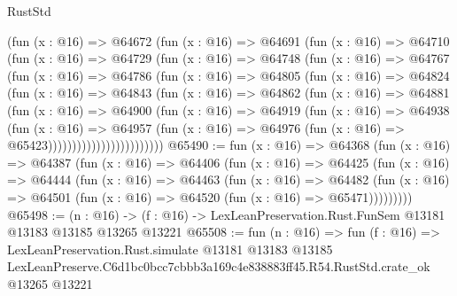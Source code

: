\begin{lexlean}{RustStd}
\begin{coremodule}
                (fun (x : @16) =>
                @64672
                  (fun (x : @16) =>
                  @64691
                    (fun (x : @16) =>
                    @64710
                      (fun (x : @16) =>
                      @64729
                        (fun (x : @16) =>
                        @64748
                          (fun (x : @16) =>
                          @64767
                            (fun (x : @16) =>
                            @64786
                              (fun (x : @16) =>
                              @64805
                                (fun (x : @16) =>
                                @64824
                                  (fun (x : @16) =>
                                  @64843
                                    (fun (x : @16) =>
                                    @64862
                                      (fun (x : @16) =>
                                      @64881
                                        (fun (x : @16) =>
                                        @64900
                                          (fun (x : @16) =>
                                          @64919
                                            (fun (x : @16) =>
                                            @64938
                                              (fun (x : @16) =>
                                              @64957
                                                (fun (x : @16) =>
                                                @64976
                                                  (fun (x : @16) => @65423))))))))))))))))))))))))
@65490 := fun (x : @16) =>
  @64368
    (fun (x : @16) =>
    @64387
      (fun (x : @16) =>
      @64406
        (fun (x : @16) =>
        @64425
          (fun (x : @16) =>
          @64444
            (fun (x : @16) =>
            @64463
              (fun (x : @16) =>
              @64482
                (fun (x : @16) => @64501 (fun (x : @16) => @64520 (fun (x : @16) => @65471)))))))))
@65498 := (n : @16) ->
  (f : @16) -> LexLeanPreservation.Rust.FunSem @13181 @13183 @13185 @13265 @13221
@65508 := fun (n : @16) =>
  fun (f : @16) =>
  LexLeanPreservation.Rust.simulate
    @13181
    @13183
    @13185
    LexLeanPreserve.C6d1bc0bcc7cbbb3a169c4e838883ff45.R54.RustStd.crate_ok
    @13265
    @13221
\end{coremodule}
\end{lexlean}
